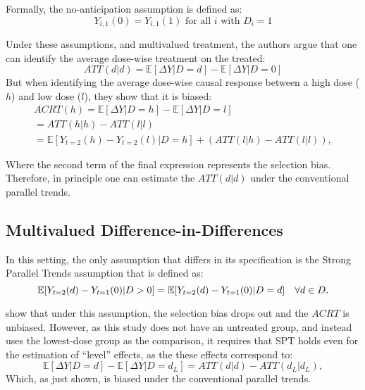 \documentclass[12pt]{article}
\begin{document}
Formally, the no-anticipation assumption is defined as:
\begin{equation}
    Y_{i,1}(0) = Y_{i,1}(1) \text{ for all } i \text{ with } D_i = 1
\end{equation}

Under these assumptions, and multivalued treatment, the authors argue that one can identify the average dose-wise treatment on the treated:
\begin{equation}
    ATT(d|d) = \mathbb{E}[\Delta Y |D = d] - \mathbb{E}[\Delta Y |D = 0]
\end{equation}
But when identifying the average dose-wise causal response between a high dose ($h$) and low dose ($l$), they show that it is biased:
\begin{gather}
ACRT(h) = \mathbb{E}[\Delta Y |D = h] - \mathbb{E}[\Delta Y |D = l] \\ 
    = AT T (h|h) - ATT(l|l) \\
    = \mathbb{E}[Y_{t=2}(h) - Y_{t=2}(l)|D = h] + (ATT(l|h) - ATT(l|l)),
\end{gather}

Where the second term of the final expression represents the selection bias. Therefore, in principle one can estimate the $ATT(d|d)$ under the conventional parallel trends.
\subsection{Multivalued Difference-in-Differences}

In this setting, the only assumption that differs in its specification is the Strong Parallel Trends assumption that is defined as: 
\begin{equation}
    \mathbb{E}[Y_{t=2}(d) - Y_{t=1}(0) | D > 0] = \mathbb{E}[Y_{t=2}(d) - Y_{t=1}(0)|D = d] \quad \forall \space d \in D.
\end{equation}

\textcite{callawayDifferenceinDifferencesContinuousTreatment2025} show that under this assumption, the selection bias drops out and the $ACRT$ is unbiased. However, as this study does not have an untreated group, and instead uses the lowest-dose group as the comparison, it requires that SPT holds even for the estimation of ``level'' effects, as the these effects correspond to:
\begin{equation}
    \mathbb{E}[\Delta Y|D = d] - \mathbb{E}[\Delta Y |D = d_L] = ATT(d|d) - ATT(d_L|d_L),
\end{equation}
Which, as just shown, is biased under the conventional parallel trends.
\end{document}
